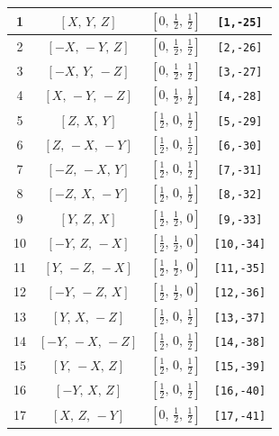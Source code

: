 \documentclass[fleqn,8pt]{jsarticle}
\begin{document}
\begin{longtable}{cccc}
1 & $\left[ X,\, Y,\, Z \right]$ & $\left[ 0,\, \frac{1}{2},\, \frac{1}{2} \right]$ & {\tt [1,-25]} \\ \hline
2 & $\left[ - X,\, - Y,\, Z \right]$ & $\left[ 0,\, \frac{1}{2},\, \frac{1}{2} \right]$ & {\tt [2,-26]} \\ \hline
3 & $\left[ - X,\, Y,\, - Z \right]$ & $\left[ 0,\, \frac{1}{2},\, \frac{1}{2} \right]$ & {\tt [3,-27]} \\ \hline
4 & $\left[ X,\, - Y,\, - Z \right]$ & $\left[ 0,\, \frac{1}{2},\, \frac{1}{2} \right]$ & {\tt [4,-28]} \\ \hline
5 & $\left[ Z,\, X,\, Y \right]$ & $\left[ \frac{1}{2},\, 0,\, \frac{1}{2} \right]$ & {\tt [5,-29]} \\ \hline
6 & $\left[ Z,\, - X,\, - Y \right]$ & $\left[ \frac{1}{2},\, 0,\, \frac{1}{2} \right]$ & {\tt [6,-30]} \\ \hline
7 & $\left[ - Z,\, - X,\, Y \right]$ & $\left[ \frac{1}{2},\, 0,\, \frac{1}{2} \right]$ & {\tt [7,-31]} \\ \hline
8 & $\left[ - Z,\, X,\, - Y \right]$ & $\left[ \frac{1}{2},\, 0,\, \frac{1}{2} \right]$ & {\tt [8,-32]} \\ \hline
9 & $\left[ Y,\, Z,\, X \right]$ & $\left[ \frac{1}{2},\, \frac{1}{2},\, 0 \right]$ & {\tt [9,-33]} \\ \hline
10 & $\left[ - Y,\, Z,\, - X \right]$ & $\left[ \frac{1}{2},\, \frac{1}{2},\, 0 \right]$ & {\tt [10,-34]} \\ \hline
11 & $\left[ Y,\, - Z,\, - X \right]$ & $\left[ \frac{1}{2},\, \frac{1}{2},\, 0 \right]$ & {\tt [11,-35]} \\ \hline
12 & $\left[ - Y,\, - Z,\, X \right]$ & $\left[ \frac{1}{2},\, \frac{1}{2},\, 0 \right]$ & {\tt [12,-36]} \\ \hline
13 & $\left[ Y,\, X,\, - Z \right]$ & $\left[ \frac{1}{2},\, 0,\, \frac{1}{2} \right]$ & {\tt [13,-37]} \\ \hline
14 & $\left[ - Y,\, - X,\, - Z \right]$ & $\left[ \frac{1}{2},\, 0,\, \frac{1}{2} \right]$ & {\tt [14,-38]} \\ \hline
15 & $\left[ Y,\, - X,\, Z \right]$ & $\left[ \frac{1}{2},\, 0,\, \frac{1}{2} \right]$ & {\tt [15,-39]} \\ \hline
16 & $\left[ - Y,\, X,\, Z \right]$ & $\left[ \frac{1}{2},\, 0,\, \frac{1}{2} \right]$ & {\tt [16,-40]} \\ \hline
17 & $\left[ X,\, Z,\, - Y \right]$ & $\left[ 0,\, \frac{1}{2},\, \frac{1}{2} \right]$ & {\tt [17,-41]} \\ \hline

\end{longtable}
\end{document}
